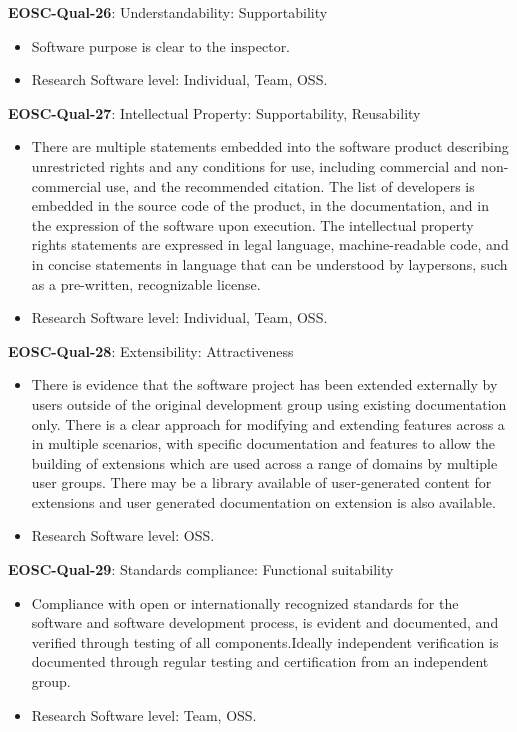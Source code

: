 \textbf{EOSC-Qual-26}: Understandability: Supportability

\begin{itemize}
    \item Software purpose is clear to the inspector.~\cite{boehm_quantitative_1976}
    \item Research Software level: Individual, Team, OSS.
\end{itemize}

\textbf{EOSC-Qual-27}: Intellectual Property: Supportability, Reusability

\begin{itemize}
    \item There are multiple statements embedded into the software product describing unrestricted rights and any conditions for use, including commercial and non-commercial use, and the recommended citation. The list of developers is embedded in the source code of the product, in the documentation, and in the expression of the software upon execution. The intellectual property rights statements are expressed in legal language, machine-readable code, and in concise statements in language that can be understood by laypersons, such as a pre-written, recognizable license.~\cite{shepherdson_cessda_2019}
    \item Research Software level: Individual, Team, OSS.
\end{itemize}

\textbf{EOSC-Qual-28}: Extensibility: Attractiveness

\begin{itemize}
    \item There is evidence that the software project has been extended externally by users outside of the original development group using existing documentation only. There is a clear approach for modifying and extending features across a in multiple scenarios, with specific documentation and features to allow the building of extensions which are used across a range of domains by multiple user groups. There may be a library available of user-generated content for extensions and user generated documentation on extension is also available.~\cite{shepherdson_cessda_2019}
    \item Research Software level: OSS.
\end{itemize}

\textbf{EOSC-Qual-29}: Standards compliance: Functional suitability

\begin{itemize}
    \item Compliance with open or internationally recognized standards for the software and software development process, is evident and documented, and verified through testing of all components.Ideally independent verification is documented through regular testing and certification from an independent group.~\cite{shepherdson_cessda_2019}
    \item Research Software level: Team, OSS.
\end{itemize}

